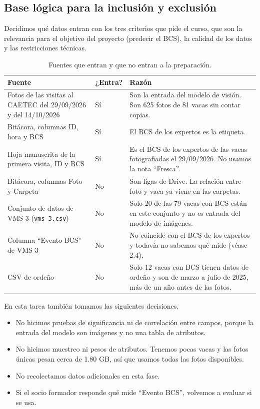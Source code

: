 \subsection{Base lógica para la inclusión y exclusión}

Decidimos qué datos entran con los tres criterios que pide el curso, que son la relevancia para el objetivo del proyecto (predecir el BCS), la calidad de los datos y las restricciones técnicas.

\begin{table}[H]
  \centering
  \small
  \caption{Fuentes que entran y que no entran a la preparación.}
  \label{tab:seleccion}
  \begin{tabularx}{\textwidth}{>{\raggedright\arraybackslash}p{}l>{\raggedright\arraybackslash}X}
    \toprule
    Fuente & ¿Entra? & Razón \\
    \midrule
    Fotos de las visitas al CAETEC del 29/09/2026 y del 14/10/2026 & Sí & Son la entrada del modelo de visión. Son 625 fotos de 81 vacas sin contar copias. \\
    \addlinespace
    Bitácora, columnas ID, hora y BCS & Sí & El BCS de los expertos es la etiqueta. \\
    \addlinespace
    Hoja manuscrita de la primera visita, ID y BCS & Sí & Es el BCS de los expertos de las vacas fotografiadas el 29/09/2026. No usamos la nota ``Fresca''. \\
    \addlinespace
    Bitácora, columnas Foto y Carpeta & No & Son ligas de Drive. La relación entre foto y vaca ya viene en las carpetas. \\
    \addlinespace
    Conjunto de datos de VMS 3 (\nolinkurl{vms-3.csv}) & No & Solo 20 de las 79 vacas con BCS están en este conjunto y no es entrada del modelo de imágenes. \\
    \addlinespace
    Columna ``Evento BCS'' de VMS 3 & No & No coincide con el BCS de los expertos y todavía no sabemos qué mide (véase 2.4). \\
    \addlinespace
    CSV de ordeño & No & Solo 12 vacas con BCS tienen datos de ordeño y son de marzo a julio de 2025, más de un año antes de las fotos. \\
    \bottomrule
  \end{tabularx}
\end{table}

En esta tarea también tomamos las siguientes decisiones.

\begin{itemize}
  \item No hicimos pruebas de significancia ni de correlación entre campos, porque la entrada del modelo son imágenes y no una tabla de atributos.
  \item No hicimos muestreo ni pesos de atributos. Tenemos pocas vacas y las fotos únicas pesan cerca de 1.80 GB, así que usamos todas las fotos disponibles.
  \item No recolectamos datos adicionales en esta fase.
  \item Si el socio formador responde qué mide ``Evento BCS'', volvemos a evaluar si se usa.
\end{itemize}

